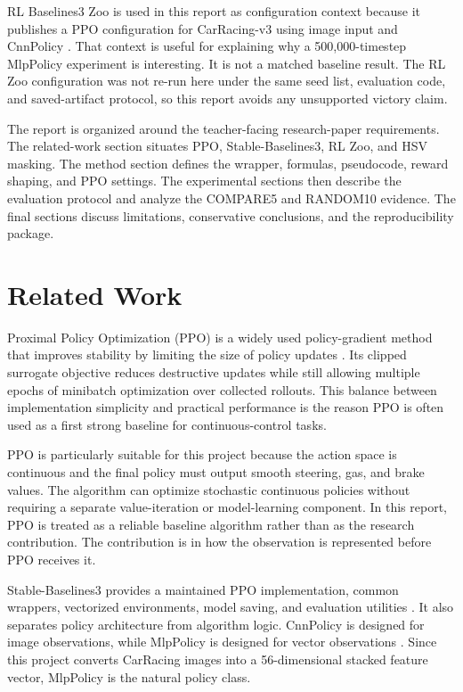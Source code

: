 \documentclass[conference]{IEEEtran}
\begin{document}
RL Baselines3 Zoo is used in this report as configuration context because it publishes a PPO configuration for CarRacing-v3 using image input and CnnPolicy \cite{ref5}. That context is useful for explaining why a 500,000-timestep MlpPolicy experiment is interesting. It is not a matched baseline result. The RL Zoo configuration was not re-run here under the same seed list, evaluation code, and saved-artifact protocol, so this report avoids any unsupported victory claim.

The report is organized around the teacher-facing research-paper requirements. The related-work section situates PPO, Stable-Baselines3, RL Zoo, and HSV masking. The method section defines the wrapper, formulas, pseudocode, reward shaping, and PPO settings. The experimental sections then describe the evaluation protocol and analyze the COMPARE5 and RANDOM10 evidence. The final sections discuss limitations, conservative conclusions, and the reproducibility package.

\section{Related Work}

Proximal Policy Optimization (PPO) is a widely used policy-gradient method that improves stability by limiting the size of policy updates \cite{ref2}. Its clipped surrogate objective reduces destructive updates while still allowing multiple epochs of minibatch optimization over collected rollouts. This balance between implementation simplicity and practical performance is the reason PPO is often used as a first strong baseline for continuous-control tasks.

PPO is particularly suitable for this project because the action space is continuous and the final policy must output smooth steering, gas, and brake values. The algorithm can optimize stochastic continuous policies without requiring a separate value-iteration or model-learning component. In this report, PPO is treated as a reliable baseline algorithm rather than as the research contribution. The contribution is in how the observation is represented before PPO receives it.

Stable-Baselines3 provides a maintained PPO implementation, common wrappers, vectorized environments, model saving, and evaluation utilities \cite{ref3}. It also separates policy architecture from algorithm logic. CnnPolicy is designed for image observations, while MlpPolicy is designed for vector observations \cite{ref4}. Since this project converts CarRacing images into a 56-dimensional stacked feature vector, MlpPolicy is the natural policy class.
\end{document}
